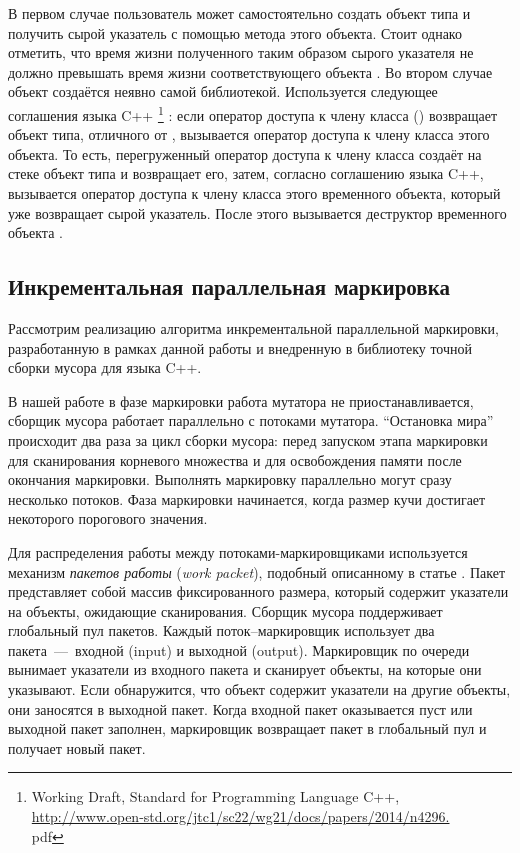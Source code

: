 В первом случае пользователь может самостоятельно создать объект типа  и 
получить сырой указатель с помощью метода  этого объекта. 
Стоит однако отметить, что время жизни полученного таким образом сырого указателя не 
должно превышать время жизни соответствующего объекта . 
Во втором случае объект  создаётся неявно самой библиотекой. 
Используется следующее соглашения языка C++ 
\footnote{Working Draft, Standard for Programming Language C++,\\
\url{http://www.open-std.org/jtc1/sc22/wg21/docs/papers/2014/n4296.}\\{pdf}}
: если оператор доступа к 
члену класса () возвращает объект типа, отличного от , 
вызывается оператор доступа к члену класса этого объекта. 
То есть, перегруженный оператор доступа к члену класса  создаёт на стеке 
объект типа  и возвращает его, затем, согласно соглашению языка C++, 
вызывается оператор доступа к члену класса этого временного объекта, 
который уже возвращает сырой указатель. 
После этого вызывается деструктор временного объекта .  


\subsection{Инкрементальная параллельная маркировка}
Рассмотрим реализацию алгоритма инкрементальной параллельной маркировки, разработанную в 
рамках данной работы и внедренную в библиотеку точной сборки мусора для языка C++.

В нашей работе в фазе маркировки работа мутатора не приостанавливается, сборщик мусора 
работает параллельно с потоками мутатора. 
``Остановка мира'' происходит два раза за цикл сборки мусора: перед запуском этапа 
маркировки для сканирования корневого множества и для освобождения памяти после 
окончания маркировки. 
Выполнять маркировку параллельно могут сразу несколько потоков. 
Фаза маркировки начинается, когда размер кучи достигает некоторого порогового значения. 

Для распределения работы между потоками-маркировщиками используется механизм 
\emph{пакетов работы} (\emph{work packet}), подобный описанному в статье 
\cite{barabash2005parallel}. 
Пакет представляет собой массив фиксированного размера, который содержит указатели на 
объекты, ожидающие сканирования. 
Сборщик мусора поддерживает глобальный пул пакетов. 
Каждый поток--маркировщик использует два пакета~---~входной (input) и выходной (output). 
Маркировщик по очереди вынимает указатели из входного пакета и сканирует объекты, на которые 
они указывают. 
Если обнаружится, что объект содержит указатели на другие объекты, они заносятся в выходной 
пакет. 
Когда входной пакет оказывается пуст или выходной пакет заполнен, маркировщик возвращает пакет 
в глобальный пул и получает новый пакет. 

